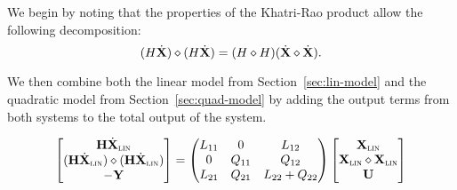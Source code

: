We begin by noting that the properties of the Khatri-Rao product allow the following decomposition:
\begin{equation*}
    (H \dot{\mathbf{X}}) \diamond (H \dot{\mathbf{X}}) = (H \diamond H) (\dot{\mathbf{X}} \diamond \dot{\mathbf{X}}).
\end{equation*}

We then combine both the linear model from Section~\ref{sec:lin-model} and the quadratic model from Section~\ref{sec:quad-model} by adding the output terms from both systems to the total output of the system.

\begin{equation*}
    \begin{bmatrix}
        \mathbf{H} \dot{\mathbf{X}}_{\textsc{lin}} \\
        (\mathbf{H} \dot{\mathbf{X}}_{\textsc{lin}}) \diamond (\mathbf{H} \dot{\mathbf{X}}_{\textsc{lin}}) \\
        - \mathbf{Y}
    \end{bmatrix} = \begin{pmatrix}
        L_{11} & 0 & L_{12} \\
        0 & Q_{11} & Q_{12} \\
        L_{21} & Q_{21} & L_{22} + Q_{22}
    \end{pmatrix}
    \begin{bmatrix}
        \mathbf{X}_{\textsc{lin}} \\
        \mathbf{X}_{\textsc{lin}} \diamond \mathbf{X}_{\textsc{lin}} \\
        \mathbf{U}
    \end{bmatrix}
\end{equation*}
